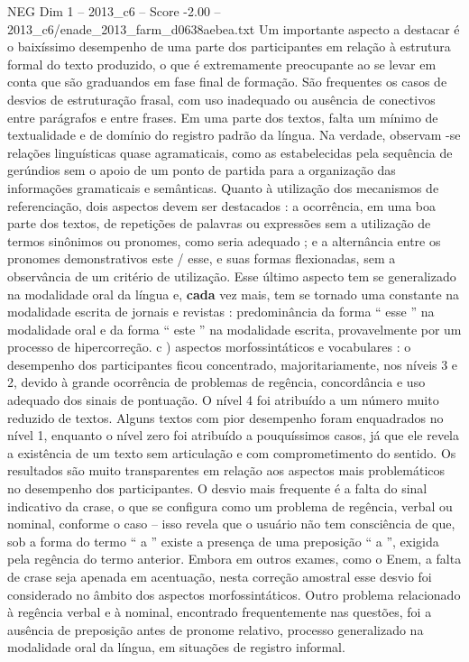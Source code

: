 \begin{textsample}{NEG Dim 1 – 2013\_c6 – Score -2.00 – 2013\_c6/enade\_2013\_farm\_d0638aebea.txt}
Um importante aspecto a destacar é o baixíssimo desempenho de uma parte dos participantes em relação à estrutura formal do texto produzido, o que é extremamente preocupante ao se levar em conta que são graduandos em fase final de formação.
São frequentes os casos de desvios de estruturação frasal, com uso inadequado ou ausência de conectivos entre parágrafos e entre frases.
Em uma parte dos textos, falta um mínimo de textualidade e de domínio do registro padrão da língua.
Na verdade, observam -se relações linguísticas quase agramaticais, como as estabelecidas pela sequência de gerúndios sem o apoio de um ponto de partida para a organização das informações gramaticais e semânticas.
Quanto à utilização dos mecanismos de referenciação, dois aspectos devem ser destacados : a ocorrência, em uma boa parte dos textos, de repetições de palavras ou expressões sem a utilização de termos sinônimos ou pronomes, como seria adequado ; e a alternância entre os pronomes demonstrativos este / esse, e suas formas flexionadas, sem a observância de um critério de utilização.
Esse último aspecto tem se generalizado na modalidade oral da língua e, \textbf{cada} vez mais, tem se tornado uma constante na modalidade escrita de jornais e revistas : predominância da forma “ esse ” na modalidade oral e da forma “ este ” na modalidade escrita, provavelmente por um processo de hipercorreção. c ) aspectos morfossintáticos e vocabulares : o desempenho dos participantes ficou concentrado, majoritariamente, nos níveis 3 e 2, devido à grande ocorrência de problemas de regência, concordância e uso adequado dos sinais de pontuação.
O nível 4 foi atribuído a um número muito reduzido de textos.
Alguns textos com pior desempenho foram enquadrados no nível 1, enquanto o nível zero foi atribuído a pouquíssimos casos, já que ele revela a existência de um texto sem articulação e com comprometimento do sentido.
Os resultados são muito transparentes em relação aos aspectos mais problemáticos no desempenho dos participantes.
O desvio mais frequente é a falta do sinal indicativo da crase, o que se configura como um problema de regência, verbal ou nominal, conforme o caso – isso revela que o usuário não tem consciência de que, sob a forma do termo “ a ” existe a presença de uma preposição “ a ”, exigida pela regência do termo anterior.
Embora em outros exames, como o Enem, a falta de crase seja apenada em acentuação, nesta correção amostral esse desvio foi considerado no âmbito dos aspectos morfossintáticos.
Outro problema relacionado à regência verbal e à nominal, encontrado frequentemente nas questões, foi a ausência de preposição antes de pronome relativo, processo generalizado na modalidade oral da língua, em situações de registro informal.

\end{textsample}
